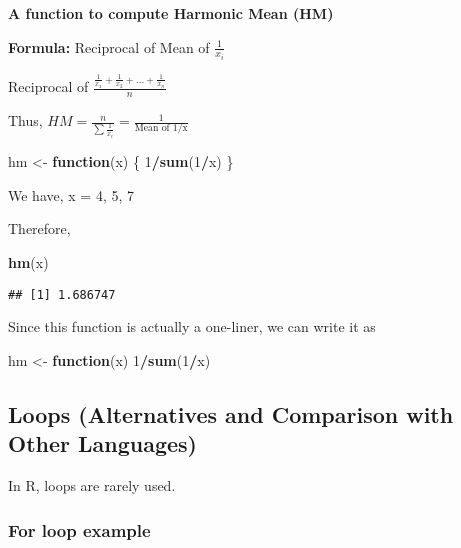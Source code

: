 \documentclass[
]{book}
\newenvironment{Shaded}{\begin{snugshade}}{\end{snugshade}}
\newcommand{\ControlFlowTok}[1]{\textcolor[rgb]{0.13,0.29,0.53}{\textbf{#1}}}
\newcommand{\DecValTok}[1]{\textcolor[rgb]{0.00,0.00,0.81}{#1}}
\newcommand{\KeywordTok}[1]{\textcolor[rgb]{0.13,0.29,0.53}{\textbf{#1}}}
\newcommand{\NormalTok}[1]{#1}
\newcommand{\OperatorTok}[1]{\textcolor[rgb]{0.81,0.36,0.00}{\textbf{#1}}}
\newcommand{\StringTok}[1]{\textcolor[rgb]{0.31,0.60,0.02}{#1}}
\begin{document}
\textbf{A function to compute Harmonic Mean (HM)}

\textbf{Formula:} Reciprocal of Mean of \(\frac{1}{x_i}\)

Reciprocal of \(\frac{\frac{1}{x_1}+\frac{1}{x_2}+...+\frac{1}{x_n}}{n}\)

Thus, \(HM = \frac{n}{\sum \frac{1}{x_i}} =\frac 1 {\text{Mean of 1/x}}\)

\begin{Shaded}
\begin{Highlighting}[]
\NormalTok{hm <-}\StringTok{ }\ControlFlowTok{function}\NormalTok{(x) \{}
  \DecValTok{1}\OperatorTok{/}\KeywordTok{sum}\NormalTok{(}\DecValTok{1}\OperatorTok{/}\NormalTok{x)}
\NormalTok{\}}
\end{Highlighting}
\end{Shaded}

We have, x = 4, 5, 7

Therefore,

\begin{Shaded}
\begin{Highlighting}[]
\KeywordTok{hm}\NormalTok{(x)}
\end{Highlighting}
\end{Shaded}

\begin{verbatim}
## [1] 1.686747
\end{verbatim}

Since this function is actually a one-liner, we can write it as

\begin{Shaded}
\begin{Highlighting}[]
\NormalTok{hm <-}\StringTok{ }\ControlFlowTok{function}\NormalTok{(x) }\DecValTok{1}\OperatorTok{/}\KeywordTok{sum}\NormalTok{(}\DecValTok{1}\OperatorTok{/}\NormalTok{x)}
\end{Highlighting}
\end{Shaded}

\hypertarget{loops-alternatives-and-comparison-with-other-languages}{%
\subsection{Loops (Alternatives and Comparison with Other Languages)}\label{loops-alternatives-and-comparison-with-other-languages}}

In R, loops are rarely used.

\hypertarget{for-loop-example}{%
\subsubsection{For loop example}\label{for-loop-example}}
\end{document}
